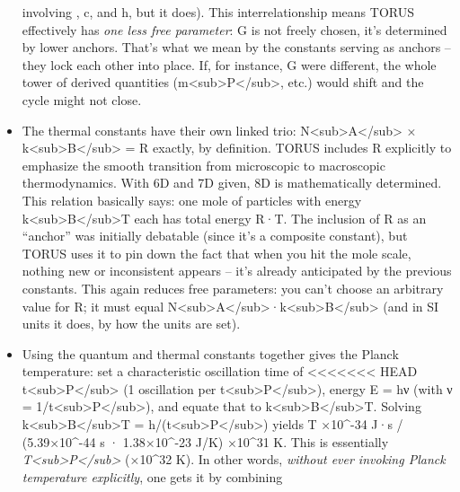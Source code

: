 \documentclass[]{article}
\begin{document}
\begin{itemize}
  involving \alpha, c, and h, but it does). This interrelationship means
  TORUS effectively has \emph{one less free parameter}: G is not freely
  chosen, it's determined by lower anchors​. That's what we mean by the
  constants serving as anchors -- they lock each other into place. If,
  for instance, G were different, the whole tower of derived quantities
  (m\textless{}sub\textgreater{}P\textless{}/sub\textgreater{}, etc.)
  would shift and the cycle might not close.
\item
  The thermal constants have their own linked trio:
  N\textless{}sub\textgreater{}A\textless{}/sub\textgreater{} ×
  k\textless{}sub\textgreater{}B\textless{}/sub\textgreater{} = R
  exactly, by definition. TORUS includes R explicitly to emphasize the
  smooth transition from microscopic to macroscopic thermodynamics​.
  With 6D and 7D given, 8D is mathematically determined. This relation
  basically says: one mole of particles with energy
  k\textless{}sub\textgreater{}B\textless{}/sub\textgreater{}T each has
  total energy R·T. The inclusion of R as an ``anchor'' was initially
  debatable (since it's a composite constant), but TORUS uses it to pin
  down the fact that when you hit the mole scale, nothing new or
  inconsistent appears -- it's already anticipated by the previous
  constants​. This again reduces free parameters: you can't choose an
  arbitrary value for R; it must equal
  N\textless{}sub\textgreater{}A\textless{}/sub\textgreater{}·k\textless{}sub\textgreater{}B\textless{}/sub\textgreater{}
  (and in SI units it does, by how the units are set).
\item
  Using the quantum and thermal constants together gives the Planck
  temperature: set a characteristic oscillation time of
<<<<<<< HEAD
  t\textless sub\textgreater P\textless/sub\textgreater{} (1 oscillation
  per t\textless sub\textgreater P\textless/sub\textgreater), energy E =
  hν (with ν = 1/t\textless sub\textgreater P\textless/sub\textgreater),
  and equate that to
  k\textless sub\textgreater B\textless/sub\textgreater T. Solving
  k\textless sub\textgreater B\textless/sub\textgreater T =
  h/(t\textless sub\textgreater P\textless/sub\textgreater) yields T ×10\^{}-34 J·s / (5.39×10\^{}-44 s · 1.38×10\^{}-23 J/K) ×10\^{}31 K\hspace{0pt}. This is essentially
  \emph{T\textless sub\textgreater P\textless/sub\textgreater{}} (×10\^{}32 K)\hspace{0pt}. In other words, \emph{without ever
  invoking Planck temperature explicitly}, one gets it by combining

\end{itemize}
\end{document}
